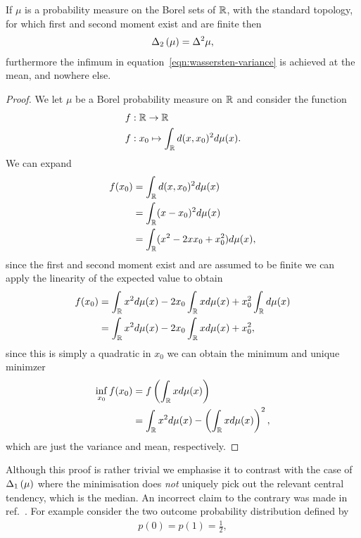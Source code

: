 \begin{lem}\label{lem:prelims-wasserstein-var-equals-var}
  If $\mu$ is a probability measure on the Borel sets of $\mathbb{R}$, with the standard topology, for which first and second moment exist and are finite then 
  \begin{align}
    \wsDev{\mu}[2] = \var{\mu},
  \end{align}
  furthermore the infimum in equation~\eqref{eqn:wassersten-variance} is achieved at the mean, and nowhere else.
\end{lem}
\begin{proof}
  We let $\mu$ be a Borel probability measure on $\mathbb{R}$ and consider the function
  \begin{align}
    f&:\mathbb{R}\to\mathbb{R}\\
    f&:x_0\mapsto \int_{\mathbb{R}} d(x,x_0)^2 d\mu(x).
  \end{align}
  We can expand 
  \begin{align}
    f(x_0) &= \int_{\mathbb{R}} d(x,x_0)^2 d\mu(x)\\
           &= \int_{\mathbb{R}} (x - x_0)^2 d\mu(x)\\
           &= \int_{\mathbb{R}} (x^2 - 2x x_0 + x_0^2) d\mu(x),
  \end{align}
  since the first and second moment exist and are assumed to be finite we can apply the linearity of the expected value to obtain
  \begin{align}
    f(x_0) &= \int_{\mathbb{R}} x^2d\mu(x) - 2x_0 \int_{\mathbb{R}} x d\mu(x) + x_0^2\int_{\mathbb{R}} d\mu(x)\\
           &= \int_{\mathbb{R}} x^2d\mu(x) - 2x_0 \int_{\mathbb{R}} x d\mu(x) + x_0^2,
  \end{align}
  since this is simply a quadratic in $x_0$ we can obtain the minimum and unique minimzer
  \begin{align}
    \inf_{x_0}f(x_0) &= f\left(\int_{\mathbb{R}} x d\mu(x)\right)\\
                    &= \int_{\mathbb{R}} x^2d\mu(x) - \left(\int_{\mathbb{R}} x d\mu(x)\right)^2,
  \end{align}
  which are just the variance and mean, respectively.
\end{proof}
Although this proof is rather trivial we emphasise it to contrast with the case of $\wsDev{\mu}[1]$ where the minimisation does \emph{not} uniquely pick out the relevant central tendency, which is the median. An incorrect claim to the contrary was made in ref.~\cite{blw-meas-uncertainty}. For example consider the two outcome probability distribution defined by
\begin{align}
  p(0) = p(1) = \frac{1}{2},
\end{align}
